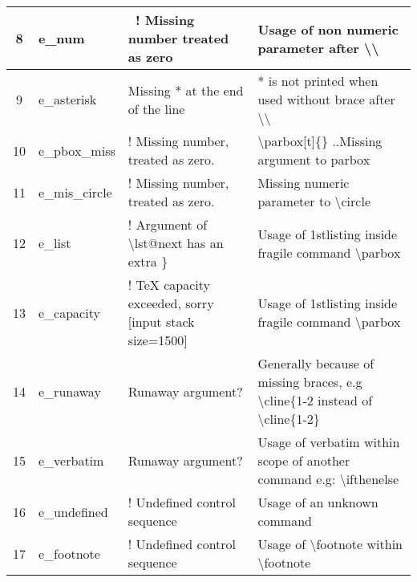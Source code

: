 \documentclass[cn,10pt,math=newtx,citestyle=gb7714-2015,bibstyle=gb7714-2015]{elegantbook}
\begin{document}
\begin{sidewaystable}
\begin{tabular}{|c|l|l|l|}
		\hline
		8  & e\_num                     & ~! Missing number treated as zero                             & Usage of non numeric parameter after \textbackslash{}\textbackslash{}                                                        \\ 
		\hline
		9  & e\_asterisk                & Missing * at the end of the line                              & * is not printed when used without brace after \textbackslash{}\textbackslash{}                                              \\ 
		\hline
		10 & e\_pbox\_miss              & ! Missing number, treated as zero.                            & \textbackslash{}parbox[t]\{\} ..Missing argument to parbox                                                                   \\ 
		\hline
		11 & e\_mis\_circle             & ! Missing number, treated as zero.                            & Missing numeric parameter to \textbackslash{}circle                                                                          \\ 
		\hline
		12 & e\_list                    & ! Argument of \textbackslash{}lst@next has an extra \}        & Usage of 1stlisting inside fragile command \textbackslash{}parbox                                                            \\ 
		\hline
		13 & e\_capacity                & ! TeX capacity exceeded, sorry [input stack size=1500]        & Usage of 1stlisting inside fragile command \textbackslash{}parbox                                                            \\ 
		\hline
		14 & e\_runaway                 & Runaway argument?                                             & Generally because of missing braces, e.g \textbackslash{}cline\{1-2 instead of 
		\textbackslash{}cline\{1-2\}           \\ 
		\hline
		15 & e\_verbatim                & Runaway argument?                                             & Usage of verbatim within scope of another command e.g: \textbackslash{}ifthenelse                                            \\ 
		\hline
		16 & e\_undefined               & ! Undefined control sequence                                  & Usage of an unknown command                                                                                                  \\ 
		\hline
		17 & e\_footnote                & ! Undefined control sequence                                  & Usage of \textbackslash{}footnote within \textbackslash{}footnote                                                            \\ 

\end{tabular}
\end{sidewaystable}
\end{document}
